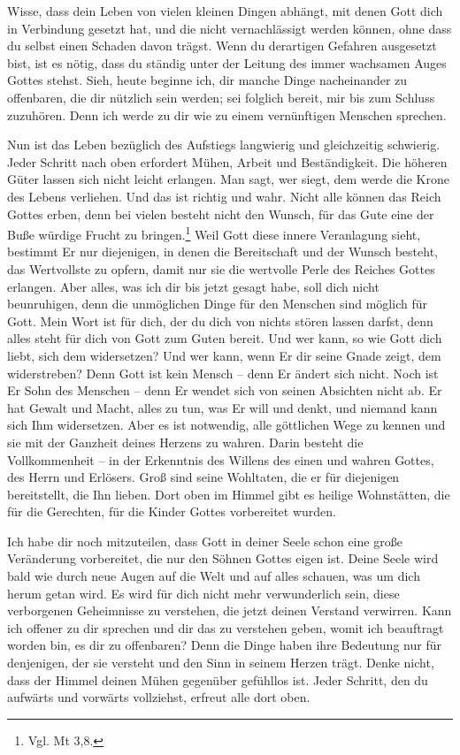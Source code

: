 Wisse, dass dein Leben von vielen kleinen Dingen abhängt, mit denen Gott dich in Verbindung gesetzt hat, und die nicht vernachlässigt werden können, ohne dass du selbst einen Schaden davon trägst. Wenn du derartigen Gefahren ausgesetzt bist, ist es nötig, dass du ständig unter der Leitung des immer wachsamen Auges Gottes stehst. Sieh, heute beginne ich, dir manche Dinge nacheinander zu offenbaren, die dir nützlich sein werden; sei folglich bereit, mir bis zum Schluss zuzuhören. Denn ich werde zu dir wie zu einem vernünftigen Menschen sprechen. 

Nun ist das Leben bezüglich des Aufstiegs langwierig und gleichzeitig schwierig. Jeder Schritt nach oben erfordert Mühen, Arbeit und Beständigkeit. Die höheren Güter lassen sich nicht leicht erlangen. Man sagt, wer siegt, dem werde die Krone des Lebens verliehen. Und das ist richtig und wahr. Nicht alle können das Reich Gottes erben, denn bei vielen besteht nicht den Wunsch, für das Gute eine der Buße würdige Frucht zu bringen.\footnote{Vgl. Mt 3,8.} Weil Gott diese innere Veranlagung sieht, bestimmt Er nur diejenigen, in denen die Bereitschaft und der Wunsch besteht, das Wertvollste zu opfern, damit nur sie die wertvolle Perle des Reiches Gottes erlangen. Aber alles, was ich dir bis jetzt gesagt habe, soll dich nicht beunruhigen, denn die unmöglichen Dinge für den Menschen sind möglich für Gott. Mein Wort ist für dich, der du dich von nichts stören lassen darfst, denn alles steht für dich von Gott zum Guten bereit. Und wer kann, so wie Gott dich liebt, sich dem widersetzen? Und wer kann, wenn Er dir seine Gnade zeigt, dem widerstreben? Denn Gott ist kein Mensch -- denn Er ändert sich nicht. Noch ist Er Sohn des Menschen -- denn Er wendet sich von seinen Absichten nicht ab. Er hat Gewalt und Macht, alles zu tun, was Er will und denkt, und niemand kann sich Ihm widersetzen. Aber es ist notwendig, alle göttlichen Wege zu kennen und sie mit der Ganzheit deines Herzens zu wahren. Darin besteht die Vollkommenheit -- in der Erkenntnis des Willens des einen und wahren Gottes, des Herrn und Erlösers. Groß sind seine Wohltaten, die er für diejenigen bereitstellt, die Ihn lieben. Dort oben im Himmel gibt es heilige Wohnstätten, die für die Gerechten, für die Kinder Gottes vorbereitet wurden.

Ich habe dir noch mitzuteilen, dass Gott in deiner Seele schon eine große Veränderung vorbereitet, die nur den Söhnen Gottes eigen ist. Deine Seele wird bald wie durch neue Augen auf die Welt und auf alles schauen, was um dich herum getan wird. Es wird für dich nicht mehr verwunderlich sein, diese verborgenen Geheimnisse zu verstehen, die jetzt deinen Verstand verwirren. Kann ich offener zu dir sprechen und dir das zu verstehen geben, womit ich beauftragt worden bin, es dir zu offenbaren? Denn die Dinge haben ihre Bedeutung nur für denjenigen, der sie versteht und den Sinn in seinem Herzen trägt. Denke nicht, dass der Himmel deinen Mühen gegenüber gefühllos ist. Jeder Schritt, den du aufwärts und vorwärts vollziehst, erfreut alle dort oben. 

